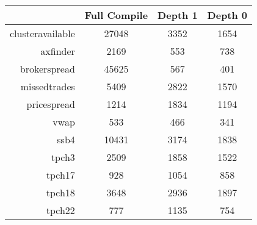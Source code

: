 \begin{tabular}{|r|c|c|c|}\hline
\ & Full Compile & Depth 1 & Depth 0 \\\hline
clusteravailable & 27048 & 3352 & 1654 \\\hline
axfinder & 2169 & 553 & 738 \\\hline
brokerspread & 45625 & 567 & 401 \\\hline
missedtrades & 5409 & 2822 & 1570 \\\hline
pricespread & 1214 & 1834 & 1194 \\\hline
vwap & 533 & 466 & 341 \\\hline
ssb4 & 10431 & 3174 & 1838 \\\hline
tpch3 & 2509 & 1858 & 1522 \\\hline
tpch17 & 928 & 1054 & 858 \\\hline
tpch18 & 3648 & 2936 & 1897 \\\hline
tpch22 & 777 & 1135 & 754 \\\hline
\end{tabular}
